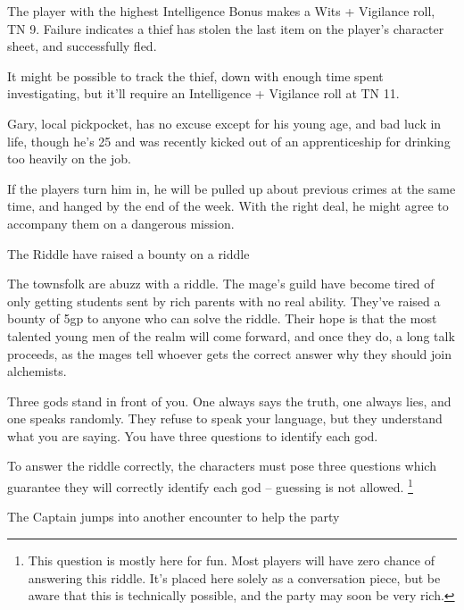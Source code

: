 \begin{multicols}{2}
\begin{boxtext}
\end{boxtext}

The player with the highest Intelligence Bonus makes a Wits + Vigilance roll, TN 9.
Failure indicates a thief has stolen the last item on the player's character sheet, and successfully fled.

It might be possible to track the thief, down with enough time spent investigating, but it'll require an Intelligence + Vigilance roll at TN 11.

Gary, local pickpocket, has no excuse except for his young age, and bad luck in life, though he's 25 and was recently kicked out of an apprenticeship for drinking too heavily on the job.

If the players turn him in, he will be pulled up about previous crimes at the same time, and hanged by the end of the week.
With the right deal, he might agree to accompany them on a dangerous mission.


{The Riddle}%
{ have raised a bounty on a riddle}%

The townsfolk are abuzz with a riddle.
The mage's guild have become tired of only getting students sent by rich parents with no real ability.
They've raised a bounty of 5gp to anyone who can solve the riddle.
Their hope is that the most talented young men of the realm will come forward, and once they do, a long talk proceeds, as the mages tell whoever gets the correct answer why they should join \gls{alchemists}.

\begin{boxtext}
Three gods stand in front of you.  One always says the truth, one always lies, and one speaks randomly.  They refuse to speak your language, but they understand what you are saying.  You have three questions to identify each god.
\end{boxtext}

To answer the riddle correctly, the characters must pose three questions which guarantee they will correctly identify each god -- guessing is not allowed.
\footnote{This question is mostly here for fun.  Most players will have zero chance of answering this riddle.
It's placed here solely as a conversation piece, but be aware that this is technically possible, and the party may soon be very rich.}

{\squash The Captain}%
{ jumps into another encounter to help the party}%


\end{multicols}
